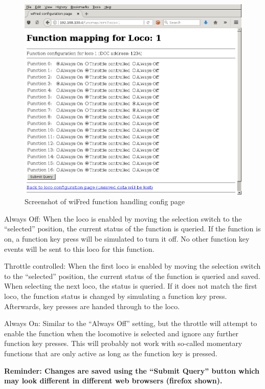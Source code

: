 \documentclass[11pt,a4paper]{scrartcl}
\begin{document}
\begin{figure}[tbh]
  \centering
  \includegraphics[width=0.8 \textwidth]{images/screenShot_functions}
  \caption{Screenshot of wiFred function handling config page}
  \label{throttleConfigFunctionPage}
\end{figure}

\begin{description}
\item{Always Off:} When the loco is enabled by moving the selection switch to the ``selected'' position, the current status of the function is queried. If the function is on, a function key press will be simulated to turn it off. No other function key events will be sent to this loco for this function.
\item{Throttle controlled:} When the first loco is enabled by moving the selection switch to the ``selected'' position, the current status of the function is queried and saved. When selecting the next loco, the status is queried. If it does not match the first loco, the function status is changed by simulating a function key press. Afterwards, key presses are handed through to the loco.
\item{Always On:} Similar to the ``Always Off'' setting, but the throttle will attempt to enable the function when the locomotive is selected and ignore any further function key presses. This will probably not work with so-called momentary functions that are only active as long as the function key is pressed.
\end{description}

\textbf{Reminder: Changes are saved using the ``Submit Query'' button which may look different in different web browsers (firefox shown).}
\end{document}
